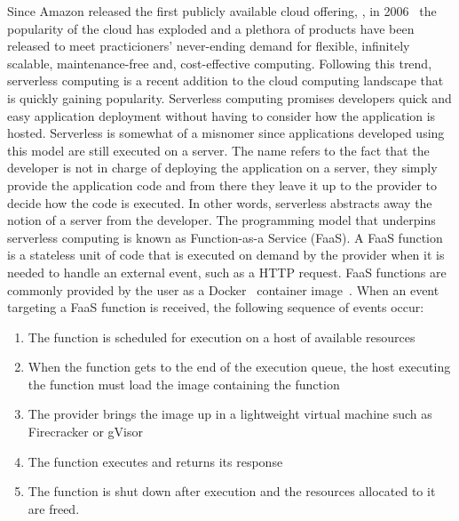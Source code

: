 \documentclass[../main.tex]{subfiles}
\begin{document}
\begin{refsection}
Since Amazon released the first publicly available cloud offering,
, in 2006~\cite{qian2009cloud} the popularity of
the cloud has exploded and a plethora of products have been released
to meet practicioners' never-ending demand for flexible, infinitely
scalable, maintenance-free and, cost-effective computing. Following
this trend, serverless computing is a recent addition to the cloud
computing landscape that is quickly gaining popularity. Serverless
computing promises developers quick and easy application deployment
without having to consider how the application is hosted. Serverless
is somewhat of a misnomer since applications developed using this
model are still executed on a server. The name refers to the fact that
the developer is not in charge of deploying the application on a
server, they simply provide the application code and from there they
leave it up to the provider to decide how the code is executed. In other
words, serverless abstracts away the notion of a server from the
developer. The programming model that underpins serverless computing
is known as Function-as-a Service (FaaS). A FaaS function is a
stateless unit of code that is executed on demand by the provider when
it is needed to handle an external event, such as a HTTP request. FaaS
functions are commonly provided by the user as a Docker~\cite{docker}
container image~\cite{serverless_state}. When an event targeting a
FaaS function is received, the following sequence of events occur:
\begin{enumerate}
\item The function is scheduled for execution on a host of available resources
\item When the function gets to the end of the execution queue, the host executing the function must load the image containing the function
\item The provider brings the image up in a lightweight virtual machine such as Firecracker or gVisor
\item The function executes and returns its response
\item The function is shut down after execution and the resources
  allocated to it are freed.
\end{enumerate}




\end{refsection}
\end{document}

